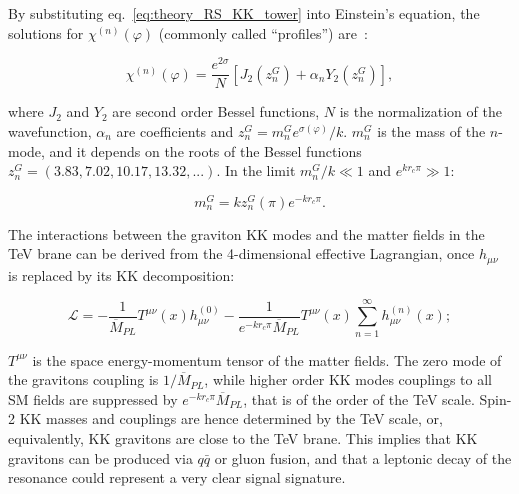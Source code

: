 \noindent By substituting eq.~\ref{eq:theory_RS_KK_tower} into Einstein's equation, the solutions for $\chi^{(n)}(\varphi)$ (commonly called ``profiles'') are~\cite{Davoudiasl:1999jd,Gherghetta:2000qt}:

\begin{equation}
\chi^{(n)}(\varphi) = \frac{e^{2 \sigma}}{N} \left[ J_2(z_n^G) + \alpha_n Y_2(z_n^G) \right],
\label{eq:theory_RS_KK_tower_profile}
\end{equation}

\noindent where $J_2$ and $Y_2$ are second order Bessel functions, $N$ is the normalization of the wavefunction, $\alpha_n$ are coefficients and $z_n^G = m_n^G e^{\sigma(\varphi)}/k$. $m_n^G$ is the mass of the $n$-mode, and it depends on the roots of the Bessel functions $z_n^G = \left( 3.83, 7.02, 10.17, 13.32, ... \right)$. In the limit $m_n^G/k \ll 1$ and $e^{k r_c \pi} \gg 1$:

\begin{equation}
m_n^G = k z_n^G(\pi) e^{-k r_c \pi}.
\label{eq:theory_RS_KK_tower_mass}
\end{equation}

\noindent The interactions between the graviton KK modes and the matter fields in the TeV brane can be derived from the 4-dimensional effective Lagrangian, once $h_{\mu \nu}$ is replaced by its KK decomposition:

\begin{equation}
\mathcal{L} = - \frac{1}{\overline{M}_{PL}} T^{\mu \nu}(x) h_{\mu \nu}^{(0)} - \frac{1}{e^{-k r_c \pi} \overline{M}_{PL}} T^{\mu \nu}(x) \sum_{n=1}^{\infty}h_{\mu \nu}^{(n)}(x);
\label{eq:theory_RS_KK_lagrangian}
\end{equation}

\noindent $T^{\mu \nu}$ is the space energy-momentum tensor of the matter fields. The zero mode of the gravitons coupling is $1/\overline{M}_{PL}$, while higher order KK modes couplings to all SM fields are suppressed by $e^{-k r_c \pi} \overline{M}_{PL}$, that is of the order of the TeV scale. Spin-2 KK masses and couplings are hence determined by the TeV scale, or, equivalently, KK gravitons are close to the TeV brane. This implies that KK gravitons can be produced via $q \bar{q}$ or gluon fusion, and that a leptonic decay of the resonance could represent a very clear signal signature.

